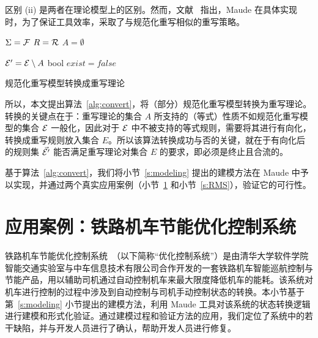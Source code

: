 区别 (ii) 是两者在理论模型上的区别。然而，文献~ 指出，Maude 在具体实现时，为了保证工具效率，采取了与规范化重写相似的重写策略。

\begin{algorithm}[ht] 

    $\Sigma = \mathcal{F}$\;
    $R = \mathcal{R}$\;
    $A = \emptyset$\;


    $\mathcal{E}' = \mathcal{E} \setminus A$\;
    bool $exist = false$\;


     
\caption{规范化重写模型转换成重写理论}
\label{alg:convert}
\end{algorithm}

所以，本文提出算法~\ref{alg:convert}，将（部分）规范化重写模型转换为重写理论。转换的关键点在于：重写理论的集合 $A$ 所支持的（等式）性质不如规范化重写模型的集合 $\mathcal{E}$ 一般化，因此对于 $\mathcal{E}$ 中不被支持的等式规则，需要将其进行有向化，转换成重写规则放入集合 $E$。所以该算法转换成功与否的关键，就在于有向化后的规则集 $\vec{\mathcal{E}'}$ 能否满足重写理论对集合 $E$ 的要求，即必须是终止且合流的。

基于算法~\ref{alg:convert}，我们将小节~\ref{s:modeling} 提出的建模方法在 Maude 中予以实现，并通过两个真实应用案例（小节~\ref{s:TO} 和小节~\ref{s:RMS}），验证它的可行性。 



\section{应用案例：铁路机车节能优化控制系统}
\label{s:TO}

铁路机车节能优化控制系统~\cite{DBLP:journals/tc/HuangDYS16}（以下简称“优化控制系统”）是由清华大学软件学院智能交通实验室与中车信息技术有限公司合作开发的一套铁路机车智能巡航控制与节能产品，用以辅助司机通过自动控制机车来最大限度降低机车的能耗。该系统对机车进行控制的过程中涉及到自动控制与司机手动控制状态的转换。本小节基于第~\ref{s:modeling} 小节提出的建模方法，利用 Maude 工具对该系统的状态转换逻辑进行建模和形式化验证。通过建模过程和验证方法的应用，我们定位了系统中的若干缺陷，并与开发人员进行了确认，帮助开发人员进行修复。

